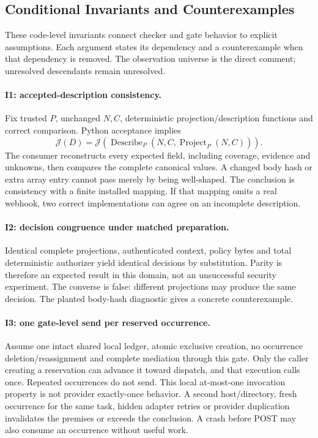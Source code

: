 \documentclass[11pt,letterpaper]{article}
\newcommand{\code}[1]{\texttt{\detokenize{#1}}}
\newcommand{\J}{\mathcal{J}}
\begin{document}
\subsection{Conditional Invariants and Counterexamples}

These code-level invariants connect checker and gate behavior to explicit
assumptions. Each argument states its dependency and a counterexample when that
dependency is removed. The observation universe is the direct comment;
unresolved descendants remain unresolved.

\paragraph{I1: accepted-description consistency.}
Fix trusted $P$, unchanged $N,C$, deterministic projection/description functions
and correct comparison. Python \code{check} acceptance implies
\[
\J(D)=\J(\operatorname{Describe}_{P}(N,C,\operatorname{Project}_{P}(N,C))).
\]
The consumer reconstructs every expected field, including coverage, evidence
and unknowns, then compares the complete canonical values. A changed body hash
or extra array entry cannot pass merely by being well-shaped. The conclusion
is consistency with a finite installed mapping. If that mapping omits a real
webhook, two correct implementations can agree on an incomplete description.

\paragraph{I2: decision congruence under matched preparation.}
Identical complete projections, authenticated context, policy bytes and total
deterministic authorizer yield identical decisions by substitution. Parity is
therefore an expected result in this domain, not an unsuccessful security
experiment. The converse is false: different projections may produce the same
decision. The planted body-hash diagnostic gives a concrete counterexample.

\paragraph{I3: one gate-level send per reserved occurrence.}
Assume one intact shared local ledger, atomic exclusive creation, no occurrence
deletion/reassignment and complete mediation through this gate. Only the caller
creating a reservation can advance it toward dispatch, and that execution calls
\code{createComment} once. Repeated occurrences do not send. This local
at-most-one invocation property is not provider exactly-once behavior. A second
host/directory, fresh occurrence for the same task, hidden adapter retries or
provider duplication invalidates the premises or exceeds the conclusion. A
crash before POST may also consume an occurrence without useful work.
\end{document}
